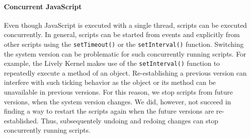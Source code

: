 \paragraph{Concurrent JavaScript}
Even though JavaScript is executed with a single thread, scripts can be executed concurrently.
In general, scripts can be started from events and explicitly from other scripts using the \lstinline{setTimeout()} or the \lstinline{setInterval()} function.
Switching the system version can be problematic for such concurrently running scripts.
For example, the Lively Kernel makes use of the \lstinline{setInterval()} function to repeatedly execute a method of an object.
Re-establishing a previous version can interfere with such ticking behavior as the object or its method can be unavailable in previous versions.
For this reason, we stop scripts from future versions, when the system version changes.
We did, however, not succeed in finding a way to restart the scripts again when the future versions are re-established.
Thus, subsequentely undoing and redoing changes can stop concurrently running scripts.



